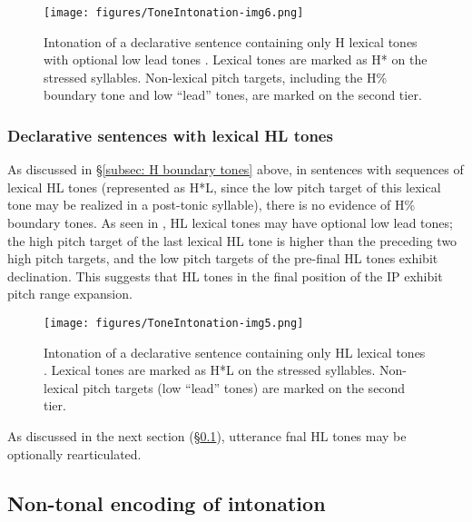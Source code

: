 \begin{figure}
\texttt{[image: figures/ToneIntonation-img6.png]}
\caption{
\label{fig: optional L lead tones in declaratives with lexical H tones}
Intonation of a declarative sentence containing only H lexical tones with optional low lead tones \parencite{kubuzono2020raramuri}. Lexical tones are marked as H* on the stressed syllables. Non-lexical pitch targets, including the H\% boundary tone and low “lead” tones, are marked on the second tier.}
\end{figure}


\subsubsection{Declarative sentences with lexical HL tones}
\label{subsubsec: intonation declaratives HL}

As discussed in §\ref{subsec: H boundary tones} above, in sentences with sequences of lexical HL tones (represented as H*L, since the low pitch target of this lexical tone may be realized in a post-tonic syllable), there is no evidence of H\% boundary tones. As seen in , HL lexical tones may have optional low lead tones; the high pitch target of the last lexical HL tone is higher than the preceding two high pitch targets, and the low pitch targets of the pre-final HL tones exhibit declination. This suggests that HL tones in the final position of the IP exhibit pitch range expansion.

\begin{figure}
\texttt{[image: figures/ToneIntonation-img5.png]}
\caption{
\label{fig: declaratives with lexical HL tones}
Intonation of a declarative sentence containing only HL lexical tones \parencite{kubuzono2020raramuri}. Lexical tones are marked as H*L on the stressed syllables. Non-lexical pitch targets (low “lead” tones) are marked on the second tier.}
\end{figure}

As discussed in the next section (§\ref{subsec: non-tonal encoding of intonation}), utterance fnal HL tones may be optionally rearticulated.

\subsection{Non-tonal encoding of intonation}
\label{subsec: non-tonal encoding of intonation}

